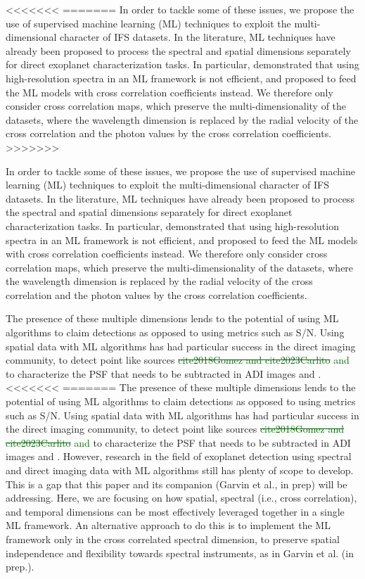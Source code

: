 \documentclass{aa}
\newcommand{\newchange}[1]{\textcolor{darkgreen}{#1}}
\begin{document}
{<<<<<<<
=======
In order to tackle some of these issues, we propose the use of supervised machine learning (ML) techniques to exploit the multi-dimensional character of IFS datasets. In the literature, ML techniques have already been proposed to process the spectral and spatial dimensions separately for direct exoplanet characterization tasks. In particular, \citet{2020Fisher} demonstrated that using high-resolution spectra in an ML framework is not efficient, and proposed to feed the ML models with cross correlation coefficients instead. 
We therefore only consider cross correlation maps, which preserve the multi-dimensionality of the datasets, where the wavelength dimension is replaced by the radial velocity of the cross correlation and the photon values by the cross correlation coefficients. 
>>>>>>>

In order to tackle some of these issues, we propose the use of supervised machine learning (ML) techniques to exploit the multi-dimensional character of IFS datasets. In the literature, ML techniques have already been proposed to process the spectral and spatial dimensions separately for direct exoplanet characterization tasks. In particular, \citet{2020Fisher} demonstrated that using high-resolution spectra in an ML framework is not efficient, and proposed to feed the ML models with cross correlation coefficients instead. 
We therefore only consider cross correlation maps, which preserve the multi-dimensionality of the datasets, where the wavelength dimension is replaced by the radial velocity of the cross correlation and the photon values by the cross correlation coefficients. 

The presence of these multiple dimensions lends to the potential of using ML algorithms to claim detections as opposed to using metrics such as S/N.
Using spatial data with ML algorithms has had particular success in the direct imaging community, to detect point like sources \newchange{\sout{ cite{2018Gomez} and cite{2023Carlito} } \citet{2018Gomez} and \citet{2023Carlito}} to characterize the PSF that needs to be subtracted in ADI images \cite{2022Gebhard} and \cite{2023Flasseur}.
<<<<<<<
=======
The presence of these multiple dimensions lends to the potential of using ML algorithms to claim detections as opposed to using metrics such as S/N.
Using spatial data with ML algorithms has had particular success in the direct imaging community, to detect point like sources \newchange{\sout{ cite{2018Gomez} and cite{2023Carlito} } \citet{2018Gomez} and \citet{2023Carlito}} to characterize the PSF that needs to be subtracted in ADI images \cite{2022Gebhard} and \cite{2023Flasseur}.
However, research in the field of exoplanet detection using spectral and direct imaging data with ML algorithms still has plenty of scope to develop. This is a gap that this paper and its companion (Garvin et al., in prep) will be addressing.
Here, we are focusing on how spatial, spectral (i.e., cross correlation), and temporal dimensions can be most effectively leveraged together in a single ML framework. 
An alternative approach to do this is to implement the ML framework only in the cross correlated spectral dimension, to preserve spatial independence and flexibility towards spectral instruments, as in Garvin et al. (in prep.).

}
\end{document}
